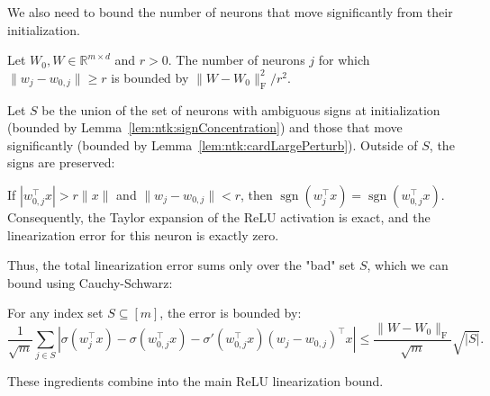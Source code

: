 We also need to bound the number of neurons that move significantly from their initialization.

\begin{lemma}\label{lem:ntk:cardLargePerturb}
  \leanok
Let $W_0, W \in \mathbb{R}^{m \times d}$ and $r > 0$. The number of neurons $j$ for which $\|w_j - w_{0,j}\| \ge r$ is bounded by $\|W - W_0\|_{\mathrm{F}}^2 / r^2$.
\end{lemma}

Let $S$ be the union of the set of neurons with ambiguous signs at initialization (bounded by Lemma~\ref{lem:ntk:signConcentration}) and those that move significantly (bounded by Lemma~\ref{lem:ntk:cardLargePerturb}). Outside of $S$, the signs are preserved:

\begin{lemma}\label{lem:ntk:signPreserved}
  \leanok
If $|w_{0,j}^\top x| > r\|x\|$ and $\|w_j - w_{0,j}\| < r$, then $\operatorname{sgn}(w_j^\top x) = \operatorname{sgn}(w_{0,j}^\top x)$. Consequently, the Taylor expansion of the ReLU activation is exact, and the linearization error for this neuron is exactly zero.
\end{lemma}

Thus, the total linearization error sums only over the "bad" set $S$, which we can bound using Cauchy-Schwarz:

\begin{lemma}\label{lem:ntk:csBound}
  \leanok
For any index set $S \subseteq [m]$, the error is bounded by:
\[
  \frac{1}{\sqrt{m}} \sum_{j \in S} \left| \sigma(w_j^\top x) - \sigma(w_{0,j}^\top x) - \sigma'(w_{0,j}^\top x)(w_j - w_{0,j})^\top x \right| \le \frac{\|W - W_0\|_{\mathrm{F}}}{\sqrt{m}} \sqrt{|S|}.
\]
\end{lemma}

These ingredients combine into the main ReLU linearization bound.

